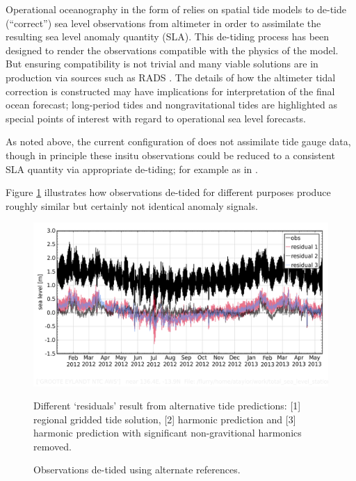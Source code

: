 Operational oceanography in the form of \BL{} relies on spatial tide models to de-tide (``correct'') sea level observations from altimeter in order to assimilate the resulting sea level anomaly quantity (SLA).   This de-tiding process has been designed to render the observations compatible with the physics of the model.  But ensuring compatibility is not trivial and  many viable solutions are in production via sources such as RADS \citep{Scharroo:2014vv}.  The details of how the altimeter tidal correction is constructed may have implications for interpretation of the final ocean forecast; long-period tides \citep{Egbert:2003jd} and nongravitational tides \citep{Arbic:2005gv} are highlighted as special points of interest with regard to operational sea level forecasts.

As noted above, the current configuration of \BL{} does not assimilate tide gauge data, though in principle these insitu observations could be reduced to a consistent SLA quantity via appropriate de-tiding; for example as in \citep{Matsumoto:2000tg}.

Figure \ref{fig:residualExample} illustrates how observations de-tided for different purposes produce roughly similar but certainly not identical anomaly signals. 

\begin{figure}[!hbt] \centering
    \includegraphics[width=\figwidthFull]{figures/plots/diag_plot_014406_detide_compare_20120101.png}
    \caption{Observations de-tided using alternate references.}{Different `residuals' result from alternative tide predictions: [1] regional gridded tide solution, [2] harmonic prediction and [3] harmonic prediction with significant non-gravitional harmonics removed. }
    \label{fig:residualExample}
\end{figure}

